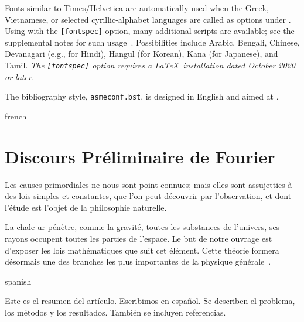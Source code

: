 \documentclass[balance,upint,subscriptcorrection,varvw,mathalfa=cal=boondoxo,spanish,french,vietnamese,russian,greek,pdf-a,colorlinks]{asmeconf}
\begin{document}
Fonts similar to Times/Helvetica are automatically used when the Greek, Vietnamese, or selected cyrillic-alphabet languages are called as options under {\upshape{}}. Using {\upshape{}} with the \texttt{[fontspec]} option, many additional scripts are available; see the supplemental notes for such usage~\cite{lienhard2021}. Possibilities include Arabic, Bengali, Chinese, Devanagari (e.g., for Hindi), Hangul (for Korean), Kana (for Japanese), and Tamil. \textit{The {\upshape\texttt{[fontspec]}} option requires a \LaTeX\ installation dated October 2020 or later.}

The bibliography style, \texttt{asmeconf.bst}, is designed in English and aimed at .  


\begin{selectlanguage}{french}%
\section{Discours Préliminaire de Fourier}\label{app:fourier}
Les causes primordiales ne nous sont point con­nues; mais elles sont assujetties à des lois simples et constantes, que l'on peut découvrir par l'obser­vation, et dont l'étude est l'objet de la philosophie naturelle. 

La chale ur pénètre, comme la gravité, toutes les substances de l'univers, ses rayons occupent toutes les parties de l'espace. Le but de notre ouvrage est d'exposer les lois mathématiques que suit cet élé­ment. Cette théorie formera désormais une des branches les plus importantes de la physique gé­nérale~\cite{fourier1822}. 
\end{selectlanguage}%
 
\begin{selectlanguage}{spanish}%
\begin{abstract*}
Este es el resumen del artículo. Escribimos en español. Se describen el problema, los métodos y los resultados. También se incluyen referencias.
\end{abstract*}
\end{selectlanguage}%

\end{document}
